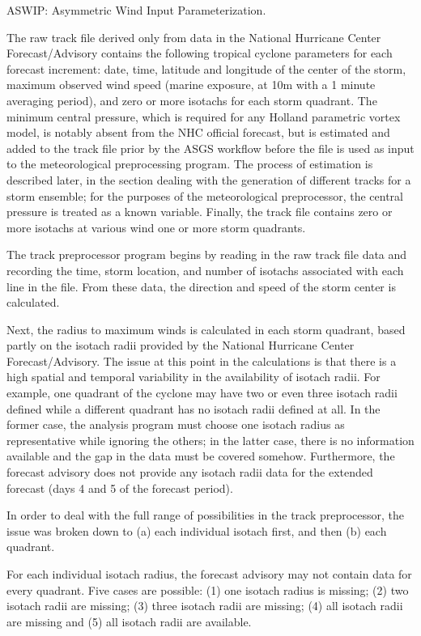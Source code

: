 \documentclass[jmse,article,submit,moreauthors,pdftex,12pt,a4paper]{mdpi}
\begin{document}
ASWIP: Asymmetric Wind Input Parameterization.

The raw track file derived only from data in the National Hurricane 
Center Forecast/Advisory contains the following tropical cyclone 
parameters for each forecast increment: date, time, latitude and 
longitude of the center of the storm, maximum observed wind speed 
(marine exposure, at 10m with a 1 minute averaging period), and zero 
or more isotachs for each storm quadrant. The minimum central 
pressure, which is required for any Holland parametric vortex model, 
is notably absent from the NHC official forecast, but is estimated 
and added to the track file prior by the ASGS workflow before the 
file is used as input to the meteorological preprocessing program. 
The process of estimation is described later, in the section dealing 
with the generation of different tracks for a storm ensemble; for 
the purposes of the meteorological preprocessor, the central 
pressure is treated as a known variable. Finally, the track file 
contains zero or more isotachs at various wind one or more storm 
quadrants.

The track preprocessor program begins by reading in the raw track file
data and recording the time, storm location, and number of isotachs
associated with each line in the file. From these data, the direction
and speed of the storm center is calculated.

Next, the radius to maximum winds is calculated in each storm 
quadrant, based partly on the isotach radii provided by the National 
Hurricane Center Forecast/Advisory. The issue at this point in the 
calculations is that there is a high spatial and temporal 
variability in the availability of isotach radii. For example, one 
quadrant of the cyclone may have two or even three isotach radii 
defined while a different quadrant has no isotach radii defined at 
all. In the former case, the analysis program must choose one 
isotach radius as representative while ignoring the others; in the 
latter case, there is no information available and the gap in the 
data must be covered somehow. Furthermore, the forecast advisory
does not provide any isotach radii data for the extended forecast
(days 4 and 5 of the forecast period).

In order to deal with the full range of possibilities in the track 
preprocessor, the issue was broken down to (a) each individual 
isotach first, and then (b) each quadrant. 

For each individual isotach radius, the forecast advisory may not 
contain data for every quadrant. Five cases are possible: (1) one 
isotach radius is missing; (2) two isotach radii are missing; (3) 
three isotach radii are missing; (4) all isotach radii are missing 
and (5) all isotach radii are available. 
\end{document}
